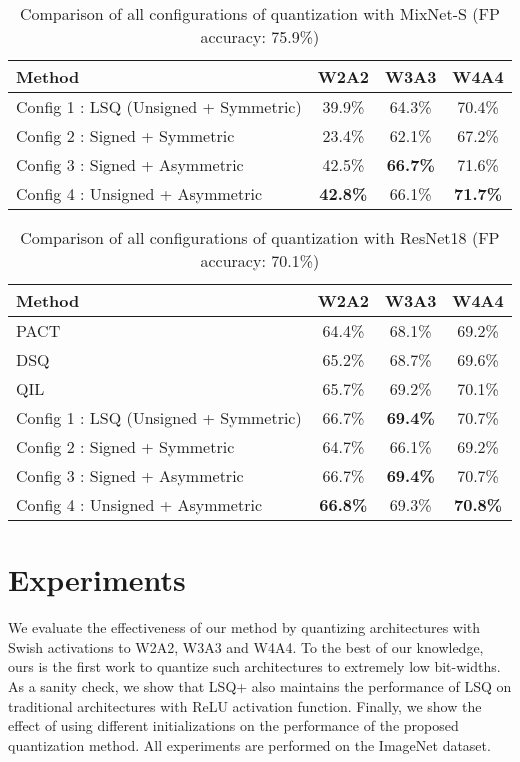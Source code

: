 \documentclass[10pt,twocolumn,letterpaper]{article}
\begin{document}
\begin{table*}[t]
	\caption{Comparison of all configurations of quantization with MixNet-S (FP accuracy: 75.9\%)}
\centering
	\begin{tabular}{l | c| c | c }
        \toprule
        	{Method} & {W2A2} & {W3A3} & {W4A4} \\
			
			\midrule
	
			Config 1 : LSQ (Unsigned + Symmetric) & 39.9\% & 64.3\% & 70.4\% \\
			Config 2 : Signed + Symmetric & 23.4\% & 62.1\% & 67.2\%  \\
			Config 3 : Signed + Asymmetric & 42.5\% & \textbf{66.7\%} & 71.6\%  \\
			Config 4 : Unsigned + Asymmetric & \textbf{42.8\%} & 66.1\% & \textbf{71.7\%} \\
        \bottomrule
	\end{tabular}
	\label{table:mixnet}
\end{table*}

\begin{table*}[t]
	\caption{Comparison of all configurations of quantization with ResNet18 (FP accuracy: 70.1\%)}
\centering
	\begin{tabular}{l | c| c | c }
        \toprule
        	{Method} & {W2A2} & {W3A3} & {W4A4} \\
			
			\midrule
	
			PACT \cite{pact2018} & 64.4\% & 68.1\% & 69.2\% \\
			DSQ \cite{dsq} & 65.2\% & 68.7\% & 69.6\% \\
			QIL \cite{qil} & 65.7\% & 69.2\% & 70.1\% \\
			Config 1 : LSQ (Unsigned + Symmetric) & 66.7\% & \textbf{69.4\%} & 70.7\% \\
			Config 2 : Signed + Symmetric & 64.7\% & 66.1\% & 69.2\%  \\
			Config 3 : Signed + Asymmetric & 66.7\% & \textbf{69.4\%} & 70.7\%  \\
			Config 4 : Unsigned + Asymmetric & \textbf{66.8\%} & 69.3\% & \textbf{70.8\%} \\
        \bottomrule
	\end{tabular}
	\label{table:resnet}
\end{table*}

\section{Experiments}
We evaluate the effectiveness of our method by quantizing architectures with Swish activations to W2A2, W3A3 and W4A4. To the best of our knowledge, ours is the first work to quantize such architectures to extremely low bit-widths. As a sanity check, we show that LSQ+ also maintains the performance of LSQ \cite{lsq} on traditional architectures with ReLU activation function. Finally, we show the effect of using different initializations on the performance of the proposed quantization method. All experiments are performed on the ImageNet \cite{ILSVRC15} dataset.
\end{document}
